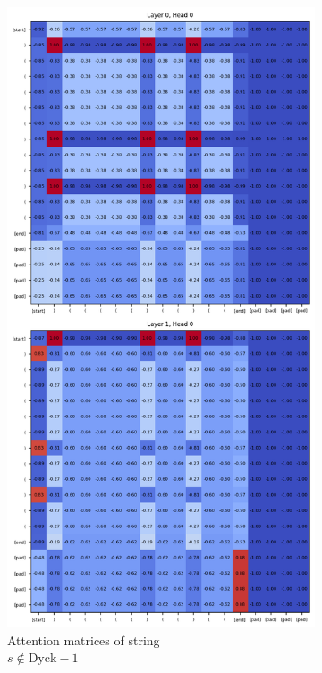 \begin{figure}[h]
    \centering
    \begin{subfigure}{.5\textwidth}
      \centering
      \includegraphics[width=.8\linewidth]{docs/figs/dyck_1/sequence_1_dyck_1.png}
      \caption{Attention matrices of string \\ $s \notin \text{Dyck}-1$}
      \label{fig:neg-dyck-1}
    \end{subfigure}%
    \begin{subfigure}{.5\textwidth}
      \centering

\end{subfigure}
\end{figure}

